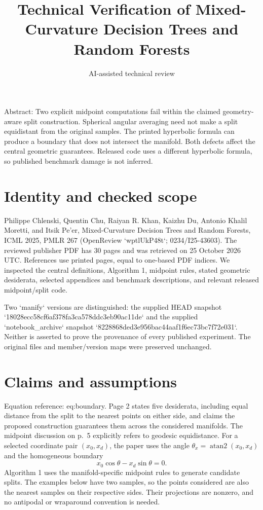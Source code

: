 \documentclass[10pt]{article}
\title{Technical Verification of
Mixed-Curvature Decision Trees and Random Forests}
\author{AI-assisted technical review}
\date{}
\begin{document}
\maketitle
Abstract: Two explicit midpoint computations fail within the claimed geometry-aware split construction. Spherical angular averaging need not make a split equidistant from the original samples. The printed hyperbolic formula can produce a boundary that does not intersect the manifold. Both defects affect the central geometric guarantees. Released code uses a different hyperbolic formula, so published benchmark damage is not inferred.\par
\section*{Identity and checked scope}
Philippe Chlenski, Quentin Chu, Raiyan R. Khan, Kaizhu Du, Antonio Khalil Moretti, and Itsik Pe’er, Mixed-Curvature Decision Trees and Random Forests, ICML 2025, PMLR 267 (OpenReview `wptlUkP48t`; 0234/I25-43603). The reviewed publisher PDF has 30 pages and was retrieved on 25 October 2026 UTC. References use printed pages, equal to one-based PDF indices. We inspected the central definitions, Algorithm 1, midpoint rules, stated geometric desiderata, selected appendices and benchmark descriptions, and relevant released midpoint/split code.\par
Two `manify` versions are distinguished: the supplied HEAD snapshot `18028ecc58cf6af378fa3ca578ddc3eb90ac11de` and the supplied `notebook\_archive` snapshot `8228868ded3e956bac44aaf1f6ec73bc7f72e031`. Neither is asserted to prove the provenance of every published experiment. The original files and member/version maps were preserved unchanged.\par
\section*{Claims and assumptions}
Equation reference: eq:boundary. Page 2 states five desiderata, including equal distance from the split to the nearest points on either side, and claims the proposed construction guarantees them across the considered manifolds. The midpoint discussion on p. 5 explicitly refers to geodesic equidistance. For a selected coordinate pair \((x_0,x_d)\), the paper uses the angle \(\theta_x=\operatorname{atan2}(x_0,x_d)\) and the homogeneous boundary \[
x_0\cos\theta-x_d\sin\theta=0.\] Algorithm 1 uses the manifold-specific midpoint rules to generate candidate splits. The examples below have two samples, so the points considered are also the nearest samples on their respective sides. Their projections are nonzero, and no antipodal or wraparound convention is needed.\par
\end{document}
